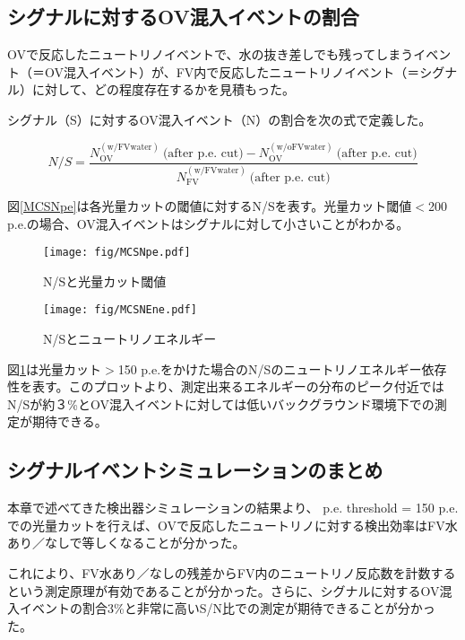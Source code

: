 \documentclass[11pt]{jreport}
\newcommand{\figref}[1]{図\ref{#1}}
\newcommand{\fv}{\mathrm{FV}}
\newcommand{\ov}{\mathrm{OV}}
\newcommand{\ww}{\mathrm{(w/ FVwater)}}
\newcommand{\wow}{\mathrm{(w/o FVwater)}}
\begin{document}
\subsection{シグナルに対するOV混入イベントの割合}
OVで反応したニュートリノイベントで、水の抜き差しでも残ってしまうイベント（＝OV混入イベント）が、FV内で反応したニュートリノイベント（＝シグナル）に対して、どの程度存在するかを見積もった。

シグナル（S）に対するOV混入イベント（N）の割合を次の式で定義した。

\begin{equation}
N/S = \frac{N_{\ov}^{\ww}\ \text{(after p.e. cut)}-N_{\ov}^{\wow}\ \text{(after p.e. cut)}}{N_{\fv}^{\ww}\ \text{(after p.e. cut)}}
\end{equation}

\figref{MCSNpe}は各光量カットの閾値に対するN/Sを表す。光量カット閾値$<$200 p.e.の場合、OV混入イベントはシグナルに対して小さいことがわかる。


\begin{figure}[htbp]
\begin{minipage}{0.47\textwidth}
\centering
\texttt{[image: fig/MCSNpe.pdf]}
\caption[N/Sとp.e. threshold]{N/Sと光量カット閾値}
\label{MCSNpe}
\end{minipage}
\hfill%
\begin{minipage}{0.47\textwidth}
\centering
\texttt{[image: fig/MCSNEne.pdf]}
\caption[N/SとEnergy]{N/Sとニュートリノエネルギー}
\label{MCSNEne}
\end{minipage}
\end{figure}


\figref{MCSNEne}は光量カット$>$150 p.e.をかけた場合のN/Sのニュートリノエネルギー依存性を表す。このプロットより、測定出来るエネルギーの分布のピーク付近ではN/Sが約３\%とOV混入イベントに対しては低いバックグラウンド環境下での測定が期待できる。


\subsection{シグナルイベントシミュレーションのまとめ}
本章で述べてきた検出器シミュレーションの結果より、
p.e. threshold = 150 p.e.での光量カットを行えば、OVで反応したニュートリノに対する検出効率はFV水あり／なしで等しくなることが分かった。

これにより、FV水あり／なしの残差からFV内のニュートリノ反応数を計数するという測定原理が有効であることが分かった。さらに、シグナルに対するOV混入イベントの割合3\%と非常に高いS/N比での測定が期待できることが分かった。
\end{document}
